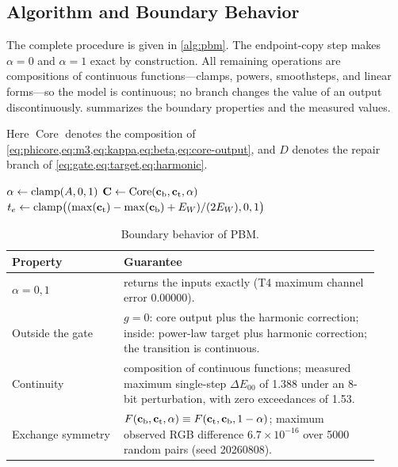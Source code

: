 \subsection{Algorithm and Boundary Behavior}
\label{sec:algorithm}

The complete procedure is given in \cref{alg:pbm}. The endpoint-copy step makes $\alpha=0$ and $\alpha=1$ exact by construction. All remaining operations are compositions of continuous functions---clamps, powers, smoothsteps, and linear forms---so the model is continuous; no branch changes the value of an output discontinuously.  summarizes the boundary properties and the measured values.

Here $\operatorname{Core}$ denotes the composition of \cref{eq:phicore,eq:m3,eq:kappa,eq:beta,eq:core-output}, and $D$ denotes the repair branch of \cref{eq:gate,eq:target,eq:harmonic}.

\begin{algorithm}[t]
\caption{PBM mixing.}
\label{alg:pbm}
$\alpha\gets\operatorname{clamp}(A,0,1)$\;
$\mathbf{C}\gets\operatorname{Core}(\mathbf{c}_{\mathrm{b}},\mathbf{c}_{\mathrm{t}},\alpha)$\;
$t_{e}\gets\operatorname{clamp}\bigl((\max(\mathbf{c}_{\mathrm{t}})-\max(\mathbf{c}_{\mathrm{b}})+E_{W})/(2E_{W}),0,1\bigr)$\;
\;
\end{algorithm}

\begin{table}[t]
\centering
\small
\caption{Boundary behavior of PBM.}
\label{tab:boundary}
\begin{tabular}{p{0.28\linewidth}p{0.64\linewidth}}
\toprule
Property & Guarantee \\
\midrule
$\alpha=0,1$ & returns the inputs exactly (T4 maximum channel error 0.00000). \\
Outside the gate & $g=0$: core output plus the harmonic correction; inside: power-law target plus harmonic correction; the transition is continuous. \\
Continuity & composition of continuous functions; measured maximum single-step $\Delta E_{00}$ of 1.388 under an 8-bit perturbation, with zero exceedances of 1.53. \\
Exchange symmetry & $F(\mathbf{c}_{\mathrm{b}},\mathbf{c}_{\mathrm{t}},\alpha)\equiv F(\mathbf{c}_{\mathrm{t}},\mathbf{c}_{\mathrm{b}},1-\alpha)$; maximum observed RGB difference $6.7\times10^{-16}$ over 5000 random pairs (seed 20260808). \\
\bottomrule
\end{tabular}
\end{table}

